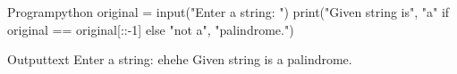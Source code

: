\documentclass[11pt]{ipu-python}
\begin{document}
    \\~\\
    \begin{code}
        {Program}{python}
original = input("Enter a string: ")
print("Given string is", "a" if original == original[::-1] else "not a", "palindrome.")
    \end{code}
    \begin{code}
        {Output}{text}
Enter a string: ehehe
Given string is a palindrome.
    \end{code}

\end{document}
